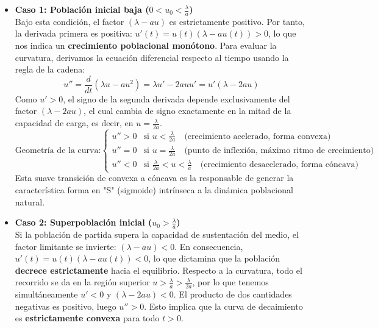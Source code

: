 {    \begin{itemize}
        \item \textbf{Caso 1: Población inicial baja ($0 < u_0 < \frac{\lambda}{a}$)} \\
        Bajo esta condición, el factor $(\lambda - au)$ es estrictamente positivo. Por tanto, la derivada primera es positiva: $u'(t) = u(t)(\lambda - a u(t)) > 0$, lo que nos indica un \textbf{crecimiento poblacional monótono}. 
        Para evaluar la curvatura, derivamos la ecuación diferencial respecto al tiempo usando la regla de la cadena:
        \[
            u'' = \frac{d}{dt}(\lambda u - a u^2) = \lambda u' - 2 a u u' = u' (\lambda - 2 a u)
        \]
        Como $u' > 0$, el signo de la segunda derivada depende exclusivamente del factor $(\lambda - 2au)$, el cual cambia de signo exactamente en la mitad de la capacidad de carga, es decir, en $u = \frac{\lambda}{2a}$.
        \[
            \text{Geometría de la curva:} \begin{cases}
                u'' > 0 & \text{si } u < \frac{\lambda}{2 a} \quad \text{(crecimiento acelerado, forma convexa)} \\
                u'' = 0 & \text{si } u = \frac{\lambda}{2 a} \quad \text{(punto de inflexión, máximo ritmo de crecimiento)} \\
                u'' < 0 & \text{si } \frac{\lambda}{2 a} < u < \frac{\lambda}{a} \quad \text{(crecimiento desacelerado, forma cóncava)}
            \end{cases}
        \]
        Esta suave transición de convexa a cóncava es la responsable de generar la característica forma en "S" (sigmoide) intrínseca a la dinámica poblacional natural.

        \item \textbf{Caso 2: Superpoblación inicial ($u_0 > \frac{\lambda}{a}$)} \\
        Si la población de partida supera la capacidad de sustentación del medio, el factor limitante se invierte: $(\lambda - au) < 0$. En consecuencia, $u'(t) = u(t)(\lambda - a u(t)) < 0$, lo que dictamina que la población \textbf{decrece estrictamente} hacia el equilibrio.
        Respecto a la curvatura, todo el recorrido se da en la región superior $u > \frac{\lambda}{a} > \frac{\lambda}{2a}$, por lo que tenemos simultáneamente $u' < 0$ y $(\lambda - 2au) < 0$. El producto de dos cantidades negativas es positivo, luego $u'' > 0$. Esto implica que la curva de decaimiento es \textbf{estrictamente convexa} para todo $t > 0$.
        

\end{itemize}}
